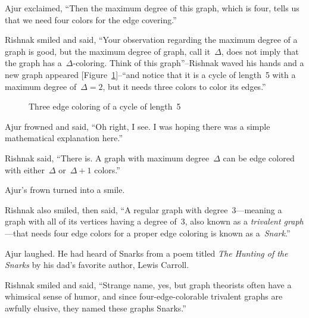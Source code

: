 Ajur exclaimed, ``Then the maximum degree of this graph, which is four, tells us that we need four colors for the edge covering.''

Rishnak smiled and said, ``Your observation regarding the maximum degree of a graph is good, but the maximum degree of graph, call it~$\Delta$, does not imply that the graph has a~$\Delta$-coloring. Think of this graph''--Rishnak waved his hands and a new graph appeared [Figure~\ref{10g6}]--``and notice that it is a cycle of length~5 with a maximum degree of~$\Delta=2$, but it needs three colors to color its edges.''

\begin{figure}
\begin{center}


\caption{Three edge coloring of a cycle of length~5}\label{10g6}
\end{center}
\end{figure}

Ajur frowned and said, ``Oh right, I see. I was hoping there was a simple mathematical explanation here.''

Rishnak said, ``There is. A graph with maximum degree~$\Delta$ can be edge colored with either~$\Delta$ or~$\Delta+1$ colors.''

Ajur's frown turned into a smile.

Rishnak also smiled, then said, ``A regular graph with degree~3---meaning a graph with all of its vertices having a degree of~3, also known as a \textit{trivalent graph}---that needs four edge colors for a proper edge coloring is known as a~\textit{Snark}.'' 

Ajur laughed. He had heard of Snarks from a poem titled \textit{The Hunting of the Snarks} by his dad's favorite author, Lewis Carroll.

Rishnak smiled and said, ``Strange name, yes, but graph theorists often have a whimsical sense of humor, and since four-edge-colorable trivalent graphs are awfully elusive, they named these graphs Snarks.''

